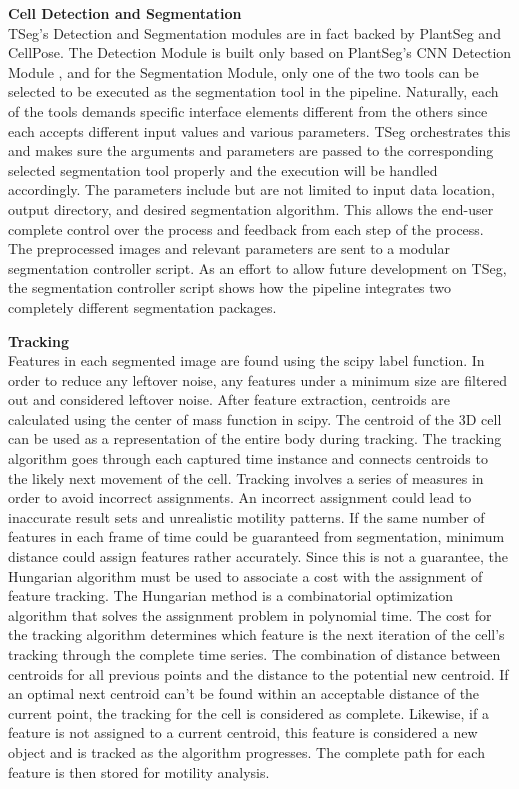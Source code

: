 \documentclass[./dissertation.tex]{subfiles}
\begin{document}
\textbf{Cell Detection and Segmentation} \\
TSeg's Detection and Segmentation modules are in fact backed by PlantSeg and CellPose. The Detection Module is built only based on PlantSeg's CNN Detection Module \cite{plantseg}, and for the Segmentation Module, only one of the two tools can be selected to be executed as the segmentation tool in the pipeline. Naturally, each of the tools demands specific interface elements different from the others since each accepts different input values and various parameters. TSeg orchestrates this and makes sure the arguments and parameters are passed to the corresponding selected segmentation tool properly and the execution will be handled accordingly. The parameters include but are not limited to input data location, output directory, and desired segmentation algorithm. This allows the end-user complete control over the process and feedback from each step of the process. The preprocessed images and relevant parameters are sent to a modular segmentation controller script. As an effort to allow future development on TSeg, the segmentation controller script shows how the pipeline integrates two completely different segmentation packages.

\textbf{Tracking} \\
Features in each segmented image are found using the scipy label function. In order to reduce any leftover noise, any features under a minimum size are filtered out and considered leftover noise. After feature extraction, centroids are calculated using the center of mass function in scipy. The centroid of the 3D cell can be used as a representation of the entire body during tracking. The tracking algorithm goes through each captured time instance and connects centroids to the likely next movement of the cell. Tracking involves a series of measures in order to avoid incorrect assignments. An incorrect assignment could lead to inaccurate result sets and unrealistic motility patterns. If the same number of features in each frame of time could be guaranteed from segmentation, minimum distance could assign features rather accurately. Since this is not a guarantee, the Hungarian algorithm must be used to associate a cost with the assignment of feature tracking. The Hungarian method is a combinatorial optimization algorithm that solves the assignment problem in polynomial time. The cost for the tracking algorithm determines which feature is the next iteration of the cell's tracking through the complete time series. The combination of distance between centroids for all previous points and the distance to the potential new centroid. If an optimal next centroid can't be found within an acceptable distance of the current point, the tracking for the cell is considered as complete. Likewise, if a feature is not assigned to a current centroid, this feature is considered a new object and is tracked as the algorithm progresses. The complete path for each feature is then stored for motility analysis.
\end{document}
